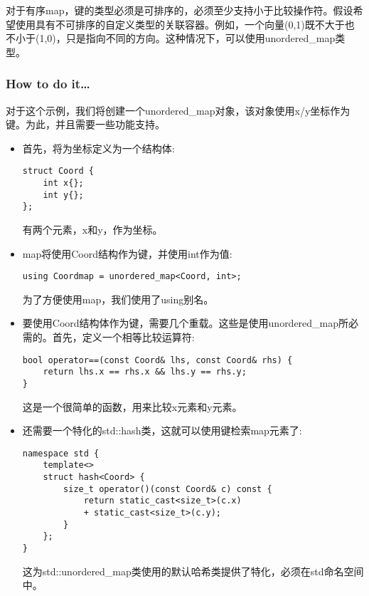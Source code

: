 
对于有序map，键的类型必须是可排序的，必须至少支持小于比较操作符。假设希望使用具有不可排序的自定义类型的关联容器。例如，一个向量(0,1)既不大于也不小于(1,0)，只是指向不同的方向。这种情况下，可以使用unordered\_map类型。

\subsubsection{How to do it…}

对于这个示例，我们将创建一个unordered\_map对象，该对象使用x/y坐标作为键。为此，并且需要一些功能支持。

\begin{itemize}
\item 
首先，将为坐标定义为一个结构体:

\begin{lstlisting}[style=styleCXX]
struct Coord {
	int x{};
	int y{};
};
\end{lstlisting}

有两个元素，x和y，作为坐标。

\item 
map将使用Coord结构作为键，并使用int作为值:

\begin{lstlisting}[style=styleCXX]
using Coordmap = unordered_map<Coord, int>;
\end{lstlisting}

为了方便使用map，我们使用了using别名。

\item 
要使用Coord结构体作为键，需要几个重载。这些是使用unordered\_map所必需的。首先，定义一个相等比较运算符:

\begin{lstlisting}[style=styleCXX]
bool operator==(const Coord& lhs, const Coord& rhs) {
	return lhs.x == rhs.x && lhs.y == rhs.y;
}
\end{lstlisting}

这是一个很简单的函数，用来比较x元素和y元素。

\item 
还需要一个特化的std::hash类，这就可以使用键检索map元素了:

\begin{lstlisting}[style=styleCXX]
namespace std {
	template<>
	struct hash<Coord> {
		size_t operator()(const Coord& c) const {
			return static_cast<size_t>(c.x)
			+ static_cast<size_t>(c.y);
		}
	};
}
\end{lstlisting}

这为std::unordered\_map类使用的默认哈希类提供了特化，必须在std命名空间中。


\end{itemize}
